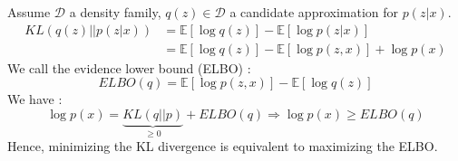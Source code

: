 Assume $\mathcal{D}$ a density family, $q(z) \in \mathcal{D}$ a candidate approximation for $p(z|x)$.
\begin{align}
KL(q(z)||p(z|x)) &= \mathbb{E}\left[\log q(z)\right] - \mathbb{E}\left[\log p(z|x)\right]\\
&= \mathbb{E}\left[\log q(z)\right] - \mathbb{E}\left[\log p(z,x)\right] + \log p(x)
\label{eq:KL_to_logP}
\end{align} 
We call the evidence lower bound (ELBO) :
\begin{equation}
ELBO(q) = \mathbb{E}\left[\log p(z,x)\right] - \mathbb{E}\left[\log q(z)\right]
\label{eq:ELBO}
\end{equation}
We have :
\begin{equation}
\log p(x) = \underbrace{KL(q||p)}_{\geq 0} + ELBO(q) \Rightarrow \log p(x) \geq ELBO(q)
\label{eq:ELBO+KL}
\end{equation}
Hence, minimizing the KL divergence is equivalent to maximizing the ELBO.\\

